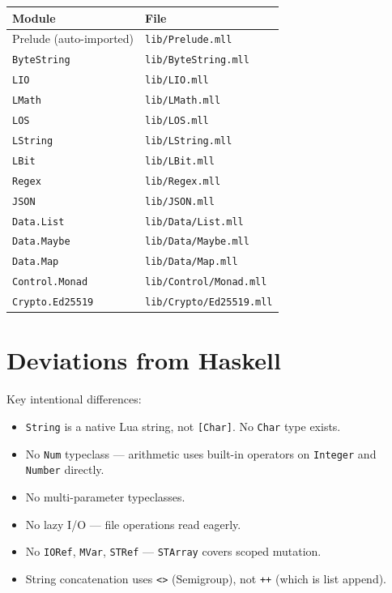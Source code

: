 \documentclass[11pt,a4paper]{article}
\begin{document}
\begin{tabular}{@{}ll@{}}
\toprule
\textbf{Module} & \textbf{File} \\
\midrule
Prelude (auto-imported) & \texttt{lib/Prelude.mll} \\
\texttt{ByteString}     & \texttt{lib/ByteString.mll} \\
\texttt{LIO}            & \texttt{lib/LIO.mll} \\
\texttt{LMath}          & \texttt{lib/LMath.mll} \\
\texttt{LOS}            & \texttt{lib/LOS.mll} \\
\texttt{LString}        & \texttt{lib/LString.mll} \\
\texttt{LBit}           & \texttt{lib/LBit.mll} \\
\texttt{Regex}          & \texttt{lib/Regex.mll} \\
\texttt{JSON}           & \texttt{lib/JSON.mll} \\
\texttt{Data.List}      & \texttt{lib/Data/List.mll} \\
\texttt{Data.Maybe}     & \texttt{lib/Data/Maybe.mll} \\
\texttt{Data.Map}       & \texttt{lib/Data/Map.mll} \\
\texttt{Control.Monad}  & \texttt{lib/Control/Monad.mll} \\
\texttt{Crypto.Ed25519} & \texttt{lib/Crypto/Ed25519.mll} \\
\bottomrule
\end{tabular}

\section{Deviations from Haskell}

Key intentional differences:
\begin{itemize}[nosep]
  \item \texttt{String} is a native Lua string, not \texttt{[Char]}.
        No \texttt{Char} type exists.
  \item No \texttt{Num} typeclass --- arithmetic uses built-in operators on
        \texttt{Integer} and \texttt{Number} directly.
  \item No multi-parameter typeclasses.
  \item No lazy I/O --- file operations read eagerly.
  \item No \texttt{IORef}, \texttt{MVar}, \texttt{STRef} ---
        \texttt{STArray} covers scoped mutation.
  \item String concatenation uses \texttt{<>} (Semigroup), not \texttt{++}
        (which is list append).
\end{itemize}
\end{document}
